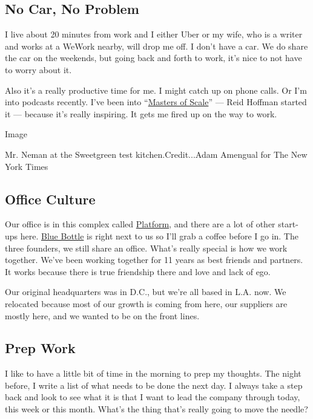 \hypertarget{no-car-no-problem}{%
\subsection{No Car, No Problem}\label{no-car-no-problem}}

I live about 20 minutes from work and I either Uber or my wife, who is a
writer and works at a WeWork nearby, will drop me off. I don't have a
car. We do share the car on the weekends, but going back and forth to
work, it's nice to not have to worry about it.

Also it's a really productive time for me. I might catch up on phone
calls. Or I'm into podcasts recently. I've been into
``\href{https://mastersofscale.com/}{Masters of Scale}'' --- Reid
Hoffman started it --- because it's really inspiring. It gets me fired
up on the way to work.

Image

Mr. Neman at the Sweetgreen test kitchen.Credit...Adam Amengual for The
New York Times

\hypertarget{office-culture}{%
\subsection{Office Culture}\label{office-culture}}

Our office is in this complex called
\href{https://platformla.com/}{Platform}, and there are a lot of other
start-ups here. \href{https://bluebottlecoffee.com/}{Blue Bottle} is
right next to us so I'll grab a coffee before I go in. The three
founders, we still share an office. What's really special is how we work
together. We've been working together for 11 years as best friends and
partners. It works because there is true friendship there and love and
lack of ego.

Our original headquarters was in D.C., but we're all based in L.A. now.
We relocated because most of our growth is coming from here, our
suppliers are mostly here, and we wanted to be on the front lines.

\hypertarget{prep-work}{%
\subsection{Prep Work}\label{prep-work}}

I like to have a little bit of time in the morning to prep my thoughts.
The night before, I write a list of what needs to be done the next day.
I always take a step back and look to see what it is that I want to lead
the company through today, this week or this month. What's the thing
that's really going to move the needle?

